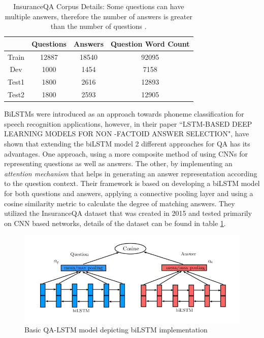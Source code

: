 \documentclass[a4paper,12pt]{report}
\begin{document}
             \begin{table}[h!]
              \centering
                \begin{tabular}{|c|c|c|c|}
                    \hline
                     & Questions & Answers & Question Word Count \\
                    \hline
                    Train & 12887 & 18540 & 92095 \\
                    \hline
                    Dev & 1000 & 1454& 7158 \\
                    \hline
                    Test1 & 1800 & 2616 & 12893 \\
                    \hline
                    Test2 & 1800 & 2593 & 12905 \\
                    \hline
                \end{tabular}
                \caption{InsuranceQA Corpus Details: Some questions can have multiple answers, therefore the number of answers is greater than the number of questions \citep{lstmInsuranceQA}.}\label{lstmInsuranceQATable}
            \end{table}

            BiLSTMs were introduced as an approach towards phoneme classification for speech recognition applications, however, in their paper ``LSTM-BASED DEEP LEARNING MODELS FOR NON -FACTOID ANSWER SELECTION", \citep{lstmhaighextractive} have shown that extending the biLSTM model 2 different approaches for QA has its advantages. One approach, using a more composite method of using CNNs for representing questions as well as answers. The other, by implementing an \textit{attention mechanism} that helps in generating an answer representation according to the question context.
            Their framework is based on developing a biLSTM model for both questions and answers, applying a connective pooling layer and using a cosine similarity metric to calculate the degree of matching answers. They utilized the InsuranceQA\citep{lstmInsuranceQA} dataset that was created in 2015 and tested primarily on CNN based networks, details of the dataset can be found in table \ref{lstmInsuranceQATable}.
            
            \begin{figure}
            	\centering
            	\includegraphics[scale=0.4]{../images/lstm-bilstmhaig.png}
            	\caption{Basic QA-LSTM model depicting biLSTM implementation \cite{lstmhaighextractive}}\label{lstmhaig}
            \end{figure}
\end{document}
